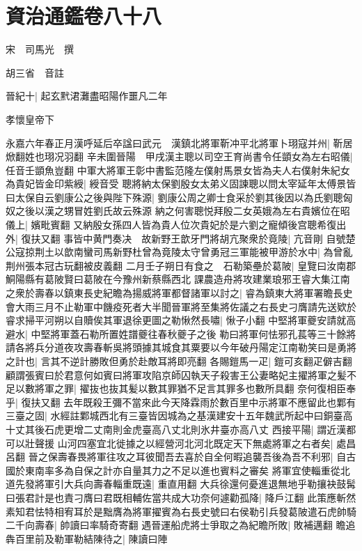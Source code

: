 \chapter{資治通鑑卷八十八}
宋　司馬光　撰

胡三省　音註

晉紀十|{
	起玄黓涒灘盡昭陽作噩凡二年}


孝懷皇帝下

永嘉六年春正月漢呼延后卒諡曰武元　漢鎮北將軍靳冲平北將軍卜珝寇并州|{
	靳居焮翻姓也珝况羽翻}
辛未圍晉陽　甲戌漢主聰以司空王育尚書令任顗女為左右昭儀|{
	任音壬顗魚豈翻}
中軍大將軍王彰中書監范隆左僕射馬景女皆為夫人右僕射朱紀女為貴妃皆金印紫綬|{
	綬音受}
聰將納太保劉殷女太弟义固諫聰以問太宰延年太傅景皆曰太保自云劉康公之後與陛下殊源|{
	劉康公周之卿士食采於劉其後因以為氏劉聰匈奴之後以漢之甥冒姓劉氏故云殊源}
納之何害聰悦拜殷二女英娥為左右貴嬪位在昭儀上|{
	嬪毗賓翻}
又納殷女孫四人皆為貴人位次貴妃於是六劉之寵傾後宫聰希復出外|{
	復扶又翻}
事皆中黄門奏决　故新野王歆牙門將胡亢聚衆於竟陵|{
	亢音剛}
自號楚公寇掠荆土以歆南蠻司馬新野杜曾為竟陵太守曾勇冠三軍能被甲游於水中|{
	為曾亂荆州張本冠古玩翻被皮義翻}
二月壬子朔日有食之　石勒築壘於葛陂|{
	皇覽曰汝南郡鮦陽縣有葛陂賢曰葛陂在今豫州新蔡縣西北}
課農造舟將攻建業琅邪王睿大集江南之衆於壽春以鎮東長史紀瞻為揚威將軍都督諸軍以討之|{
	睿為鎮東大將軍署瞻長史}
會大雨三月不止勒軍中饑疫死者大半聞晉軍將至集將佐議之右長史刁膺請先送欵於睿求掃平河朔以自贖俟其軍退徐更圖之勒愀然長嘯|{
	愀子小翻}
中堅將軍夔安請就高避水|{
	中堅將軍蓋石勒所置姓譜夔往春秋夔子之後}
勒曰將軍何怯邪孔萇等三十餘將請各將兵分道夜攻壽春斬吳將頭據其城食其粟要以今年破丹陽定江南勒笑曰是勇將之計也|{
	言其不逆計勝敗但勇於赴敵耳將即亮翻}
各賜鎧馬一疋|{
	鎧可亥翻疋僻吉翻}
顧謂張賓曰於君意何如賓曰將軍攻陷京師囚執天子殺害王公妻略妃主擢將軍之髪不足以數將軍之罪|{
	擢抜也抜其髪以數其罪猶不足言其罪多也數所具翻}
奈何復相臣奉乎|{
	復扶又翻}
去年既殺王彌不當來此今天降霖雨於數百里中示將軍不應留此也鄴有三臺之固|{
	水經註鄴城西北有三臺皆因城為之基漢建安十五年魏武所起中曰銅臺高十丈其後石虎更增二丈南則金虎臺高八丈北則氷井臺亦高八丈}
西接平陽|{
	謂近漢都可以壯聲援}
山河四塞宜北徙據之以經營河北河北既定天下無處將軍之右者矣|{
	處昌呂翻}
晉之保壽春畏將軍往攻之耳彼聞吾去喜於自全何暇追襲吾後為吾不利邪|{
	自古國於東南率多為自保之計亦自量其力之不足以進也賓料之審矣}
將軍宜使輜重從北道先發將軍引大兵向壽春輜重既遠|{
	重直用翻}
大兵徐還何憂進退無地乎勒攘袂鼓髯曰張君計是也責刁膺曰君既相輔佐當共成大功奈何遽勸孤降|{
	降戶江翻}
此策應斬然素知君怯特相宥耳於是黜膺為將軍擢賓為右長史號曰右侯勒引兵發葛陂遣石虎帥騎二千向壽春|{
	帥讀曰率騎奇寄翻}
遇晉運船虎將士爭取之為紀瞻所敗|{
	敗補邁翻}
瞻追犇百里前及勒軍勒結陳待之|{
	陳讀曰陣}

